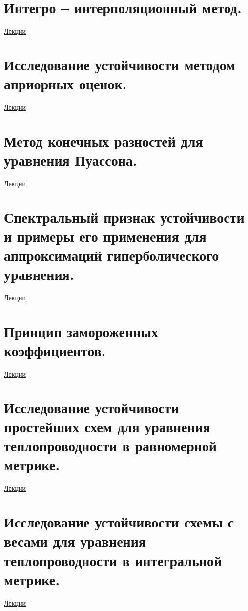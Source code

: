 \documentclass[specialist, subf, href, colorlinks=true, 12pt, times, mtpro, final]{disser}
\theoremstyle{definition}
\begin{document}
\section {Интегро -- интерполяционный метод.}
	\hyperlink {lects.121}{Лекции}\\

\section {Исследование устойчивости методом априорных оценок.}
	\hyperlink {lects.125}{Лекции}\\

\section {Метод конечных разностей для уравнения Пуассона.}
	\hyperlink {lects.128}{Лекции}\\

\section {Спектральный признак устойчивости и примеры его применения для аппроксимаций гиперболического уравнения.}
	\hyperlink {lects.130}{Лекции}\\

\section {Принцип замороженных коэффициентов.}
	\hyperlink {lects.132}{Лекции}\\

\section {Исследование устойчивости простейших схем для уравнения теплопроводности в равномерной метрике.}
	\hyperlink {lects.134}{Лекции}\\

\section {Исследование устойчивости схемы с весами для уравнения теплопроводности в интегральной метрике.}
	\hyperlink {lects.136}{Лекции}\\





\end{document}
